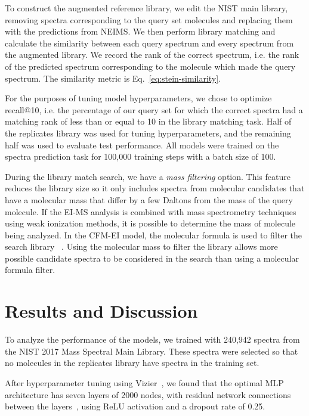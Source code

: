 To construct the augmented reference library, we edit the NIST main library, removing spectra corresponding to the query set molecules and replacing them with the predictions from NEIMS.
We then perform library matching and calculate the similarity between each query spectrum and every spectrum from the augmented library. We record the rank of the correct spectrum, i.e. the rank of the predicted spectrum corresponding to the molecule which made the query spectrum. The similarity metric is Eq.~\eqref{eq:stein-similarity}.

For the purposes of tuning model hyperparameters, we chose to optimize recall@10, i.e. the percentage of our query set for which the correct spectra had a matching rank of less than or equal to 10 in the library matching task. Half of the replicates library was used for tuning hyperparameters, and the remaining half was used to evaluate test performance. All models were trained on the spectra prediction task for 100,000 training steps with a batch size of 100.

During the library match search, we have a \textit{mass filtering} option. This feature reduces the library size so it only includes spectra from molecular candidates that have a molecular mass that differ by a few Daltons from the mass of the query molecule.
If the EI-MS analysis is combined with mass spectrometry techniques using weak ionization methods, it is possible to determine the mass of molecule being analyzed. In the CFM-EI model, the molecular formula is used to filter the search library
~\cite{allen2016computational}. Using the molecular mass to filter the library allows more possible candidate spectra to be considered in the search than using a molecular formula filter.

\section{Results and Discussion}

To analyze the performance of the models, we trained with 240,942 spectra from the NIST 2017 Mass Spectral Main Library. These spectra were selected so that no molecules in the replicates library have spectra in the training set.

After hyperparameter tuning using Vizier~\cite{Google_Vizier}, we found that the optimal MLP architecture has seven layers of 2000 nodes, with residual network connections between the layers~\cite{he_resnet}, using ReLU activation and a dropout rate of 0.25.

